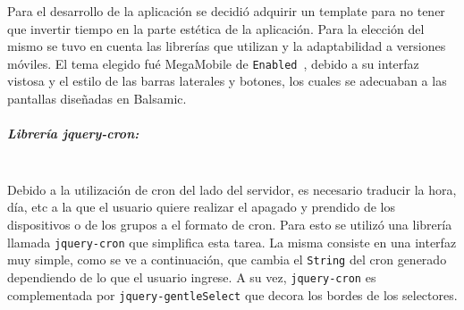 Para el desarrollo de la aplicación se decidió adquirir un template para no tener que invertir tiempo en la parte estética de la aplicación. Para la elección del mismo se tuvo en cuenta las librerías que utilizan y la adaptabilidad a versiones móviles.
El tema elegido fué MegaMobile de \lstinline[columns=fixed]{Enabled}~\cite{Enabled}, debido a su interfaz vistosa y el estilo de las barras laterales y botones, los cuales se adecuaban a las pantallas diseñadas en Balsamic.

\subparagraph{Librería jquery-cron:}\mbox{}\\
Debido a la utilización de cron del lado del servidor, es necesario traducir la hora, día, etc a la que el usuario quiere realizar el apagado y prendido de los dispositivos o de los grupos a el formato de cron. Para esto se utilizó una librería llamada \lstinline[columns=fixed]{jquery-cron} que simplifica esta tarea. La misma consiste en una interfaz muy simple, como se ve a continuación, que cambia el \lstinline[columns=fixed]{String} del cron generado dependiendo de lo que el usuario ingrese.
A su vez, \lstinline[columns=fixed]{jquery-cron} es complementada por \lstinline[columns=fixed]{jquery-gentleSelect} que decora los bordes de los selectores. ~

